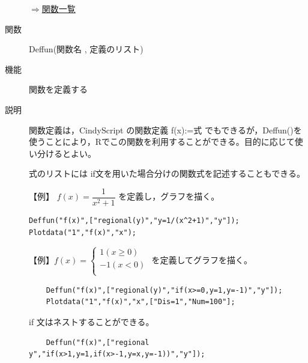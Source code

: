 \documentclass[papersize,a4paper,12pt,uplatex]{jsarticle}
\begin{document}
\begin{description}
\begin{flushright}  \hyperlink{functionlist}{$\Rightarrow$関数一覧}\end{flushright}

\vspace{\baselineskip}
\hypertarget{deffun}{}
\item[関数]  Deffun(関数名 , 定義のリスト)
\item[機能]  関数を定義する
\item[説明]  関数定義は，CindyScript の関数定義 f(x):=式 でもできるが，Deffun()を使うことにより，Rでこの関数を利用することができる。目的に応じて使い分けるとよい。

式のリストには if文を用いた場合分けの関数式を記述することもできる。

\vspace{\baselineskip}
【例】
$f(x)=\dfrac{1}{x^2+1}$ を定義し，グラフを描く。

\begin{verbatim}
Deffun("f(x)",["regional(y)","y=1/(x^2+1)","y"]);
Plotdata("1","f(x)","x");
\end{verbatim}

\vspace{\baselineskip}
\hspace{20mm}\scalebox{0.9}{}

          
\vspace{\baselineskip}
  【例】$f(x)=\left\{\begin{array}{l}1　 (x\geq 0)\\ -1 　 (x<0)\\ \end{array}\right.$     を定義してグラフを描く。

\begin{verbatim}
    Deffun("f(x)",["regional(y)","if(x>=0,y=1,y=-1)","y"]);
    Plotdata("1","f(x)","x",["Dis=1","Num=100"];
\end{verbatim}

\vspace{\baselineskip}
\hspace{20mm}\scalebox{0.9}{}

  if 文はネストすることができる。
\begin{verbatim}
    Deffun("f(x)",["regional y","if(x>1,y=1,if(x>-1,y=x,y=-1))","y"]);
\end{verbatim}

\vspace{\baselineskip}
\hspace{20mm}\scalebox{0.9}{}



\end{description}
\end{document}
